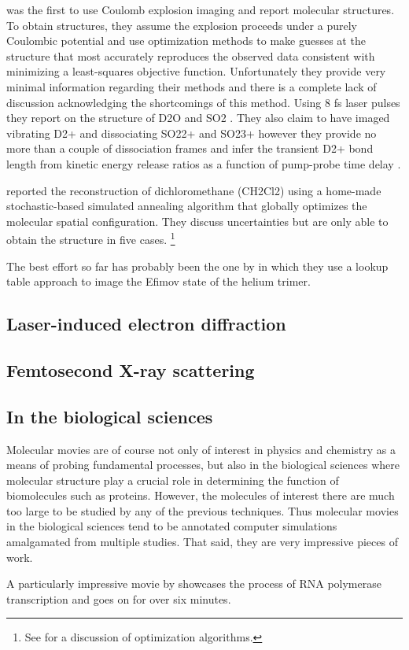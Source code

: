 \citet{Legare05structure,Legare05dynamics} was the first to use Coulomb explosion imaging and report molecular structures. To obtain structures, they assume the explosion proceeds under a purely Coulombic potential and use optimization methods to make guesses at the structure that most accurately reproduces the observed data consistent with minimizing a least-squares objective function. Unfortunately they provide very minimal information regarding their methods and there is a complete lack of discussion acknowledging the shortcomings of this method. Using 8 fs laser pulses they report on the structure of D2O and SO2 \citep{Legare05structure}. They also claim to have imaged vibrating D2+ and dissociating SO22+ and SO23+ however they provide no more than a couple of dissociation frames and infer the transient D2+ bond length from kinetic energy release ratios as a function of pump-probe time delay \citep{Legare05dynamics}.

\citet{Gagnon08} reported the reconstruction of dichloromethane (CH2Cl2) using a home-made  stochastic-based simulated annealing algorithm that globally optimizes the molecular spatial configuration. They discuss uncertainties but are only able to obtain the structure in five cases. \footnote{See \citet{Bocharova11} for a discussion of optimization algorithms.}

The best effort so far has probably been the one by \citet{Kunitski15} in which they use a lookup table approach to image the Efimov state of the helium trimer.

\subsection{Laser-induced electron diffraction}
\subsection{Femtosecond X-ray scattering}

\subsection{In the biological sciences}
Molecular movies are of course not only of interest in physics and chemistry as a means of probing fundamental processes, but also in the biological sciences where molecular structure play a crucial role in determining the function of biomolecules such as proteins. However, the molecules of interest there are much too large to be studied by any of the previous techniques. Thus molecular movies in the biological sciences tend to be annotated computer simulations amalgamated from multiple studies. That said, they are very impressive pieces of work.

A particularly impressive movie by \citet{Cheung12} showcases the process of RNA polymerase transcription and goes on for over six minutes.

